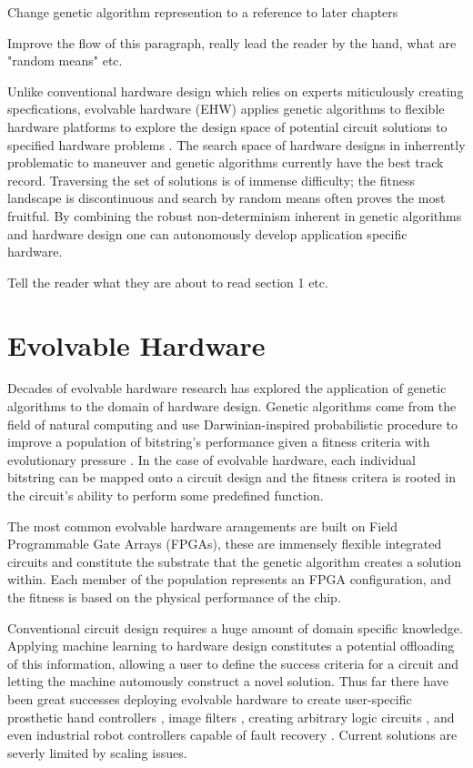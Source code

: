 \todo Change genetic algorithm represention to a reference to later chapters

\todo Improve the flow of this paragraph, really lead the reader by the hand,
what are "random means" etc.

Unlike conventional hardware design which relies on experts miticulously creating
specfications, evolvable hardware (EHW) applies genetic algorithms to
flexible hardware platforms to explore the design space of potential
circuit solutions to specified hardware problems \cite{541893}.
The search space of hardware designs in inherrently problematic to maneuver and
genetic algorithms currently have the best track record.
Traversing the set of solutions is of immense difficulty; the fitness landscape
is discontinuous and
search by random means often proves the most fruitful. By combining
the robust non-determinism inherent in genetic algorithms and hardware design
one can autonomously develop application specific hardware.

\todo Tell the reader what they are about to read section 1 etc.

\section{Evolvable Hardware}
Decades of evolvable hardware research has explored the application of genetic algorithms to
the domain of hardware design. Genetic algorithms come from the field of natural
computing and use Darwinian-inspired probabilistic procedure to improve a population
of bitstring's
performance given a fitness criteria with evolutionary pressure \cite{Goldberg:1989:GAS:534133}.
In the case of evolvable hardware,
each individual bitstring can be mapped onto a circuit design
and the fitness critera is rooted
in the circuit's ability to perform some predefined function.

The most common evolvable hardware arangements
are built on Field Programmable Gate Arrays (FPGAs), these are immensely
flexible integrated circuits and constitute the substrate that the genetic
algorithm creates a solution within. Each member of the population
represents an FPGA configuration, and the fitness is based on the
physical performance of the chip.

Conventional circuit design requires a huge amount of domain specific knowledge.
Applying machine learning to hardware design constitutes a potential
offloading of this information, allowing a user to define the success
criteria for a circuit and letting the machine automously construct a novel solution.
Thus far there have been great successes deploying evolvable hardware to
create user-specific prosthetic hand controllers \cite{Kajitani1999AnEH},
image filters \cite{HybridFilter}, creating arbitrary logic circuits
\cite{Vasicek2011}, and even industrial robot controllers capable of fault recovery \cite{10.1007/3-540-61093-6_6}.
Current solutions are severly limited by scaling issues.

